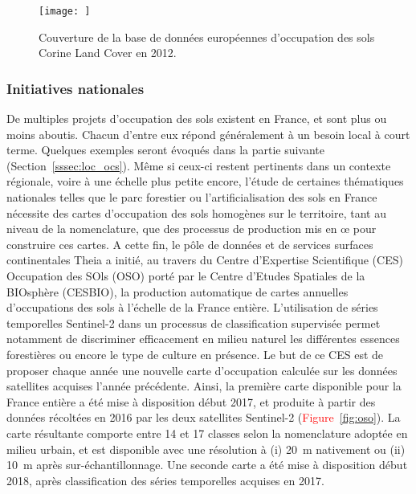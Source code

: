 \begin{figure}
    \centering
    \texttt{[image: ]}
    \caption{Couverture de la base de données européennes d'occupation des sols Corine Land Cover en 2012.}
    \label{fig:clc_europe}
\end{figure}

\subsubsection{Initiatives nationales}
\label{sssec:nat_ocs}
De multiples projets d'occupation des sols existent en France, et sont plus ou moins aboutis. Chacun d'entre eux répond généralement à un besoin local à court terme. Quelques exemples seront évoqués dans la partie suivante (Section~\ref{sssec:loc_ocs}). Même si ceux-ci restent pertinents dans un contexte régionale, voire à une échelle plus petite encore, l'étude de certaines thématiques nationales telles que le parc forestier ou l'artificialisation des sols en France nécessite des cartes d'occupation des sols homogènes sur le territoire, tant au niveau de la nomenclature, que des processus de production mis en \oe{} pour construire ces cartes. A cette fin, le pôle de données et de services surfaces continentales  Theia a initié, au travers du Centre d'Expertise Scientifique (CES) Occupation des SOls (OSO)\cite{inglada2017} porté par le Centre d'Etudes Spatiales de la BIOsphère (CESBIO), la production automatique de cartes annuelles d'occupations des sols à l'échelle de la France entière. L'utilisation de séries temporelles Sentinel-2 dans un processus de classification supervisée permet notamment de discriminer efficacement en milieu naturel les différentes essences forestières ou encore le type de culture en présence. Le but de ce CES est de proposer chaque année une nouvelle carte d'occupation calculée sur les données satellites acquises l'année précédente. Ainsi, la première carte disponible pour la France entière a été mise à disposition début 2017, et produite à partir des données récoltées en 2016 par les deux satellites Sentinel-2 (\textcolor{red}{Figure~\ref{fig:oso}}). La carte résultante comporte entre 14 et 17 classes selon la nomenclature adoptée en milieu urbain, et est disponible avec une résolution à (i) \SI{20}{\meter} nativement ou (ii) \SI{10}{\meter} après sur-échantillonnage. Une seconde carte a été mise à disposition début 2018, après classification des séries temporelles acquises en 2017.\\
